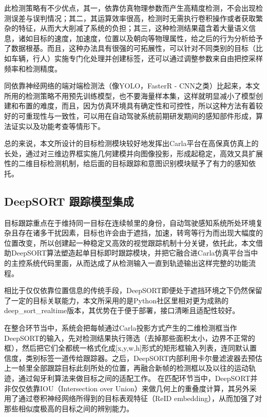 此检测策略有不少优点，其一，依靠仿真物理参数而产生高精度检测，不会出现检测误差与误判情况；其二，其运算效率很高，检测时无需执行卷积操作或者获取繁杂的特征，从而大大削减了系统的负担；其三，这种检测结果蕴含着大量语义信息，诸如目标的速度，加速度，位置以及朝向等物理属性，给之后的行为分析给予了数据根基。而且，这种办法具有很强的可拓展性，可以针对不同类别的目标（比如车辆，行人）实施专门化处理并创建标签，还可以通过调整参数来自由把控采样频率和检测精度。

同依靠神经网络的端对端检测法（像YOLO，FasterR - CNN之类）比起来，本文所用的检测策略不用预先训练模型，也不要海量样本集，这样就明显减小了模型创建和布置的难度，而且，因为仿真环境具有确定性和可控性，所以这种方法有着较好的可重现性与一致性，可以用在自动驾驶系统前期研发期间的感知部件形成，算法证实以及功能考查等情形下。

总的来说，本文所设计的目标检测模块较好地发挥出Carla平台在高保真仿真上的长处，通过对三维边界框实施几何建模并向图像投影，形成起稳定，高效又具扩展性的二维目标检测机制，给后面的目标跟踪和意图识别模块赋予了有力的感知依托。


\subsection{DeepSORT 跟踪模型集成}

目标跟踪重点在于维持同一目标在连续帧里的身份，自动驾驶感知系统所处环境复杂且存在诸多干扰因素，目标也许会由于遮挡，加速，转弯等行为而出现大幅度的位置改变，所以创建起一种稳定又高效的视觉跟踪机制十分关键，依托此，本文借助DeepSORT算法塑造起单目标即时跟踪模块，并把它融合进Carla仿真平台当中的主控系统代码里面，从而达成了从检测输入一直到轨迹输出这样完整的功能流程。

相比于仅仅依靠位置信息的传统手段，DeepSORT即便处于遮挡环境之下仍然保留了一定的目标关联能力，本文所采用的是Python社区里相对更为成熟的deep\_sort\_realtime版本，其优势在于便于部署，接口清晰且适配性较好。

在整合环节当中，系统会把每帧通过Carla投影方式产生的二维检测框当作DeepSORT的输入，先对检测结果执行筛选（去掉那些面积太小，边界不正常的框），然后把它们全都统一格式化成[x,y,w,h]形式的矩形框输入列表，连同默认置信度，类别标签一道传给跟踪器。之后，DeepSORT内部利用卡尔曼滤波器去预估上一帧里全部跟踪目标此刻所处的位置，再融合新帧的检测框以及以往的运动轨迹，通过匈牙利算法来做目标之间的适配工作。 在匹配环节当中，DeepSORT并非仅仅依靠IOU（Intersection over Union）来做几何上的重叠度计算，其另外采用了通过卷积神经网络所得到的目标表观特征（ReID embedding），从而加强了对那些相似度极高的目标之间的辨别能力。

